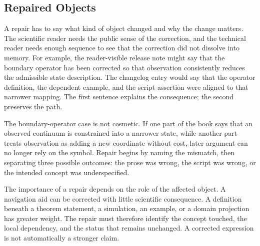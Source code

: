 \documentclass[11pt,a4paper,openany]{book}
\begin{document}
\subsection{Repaired Objects}
A repair has to say what kind of object changed and why the change matters. The scientific reader needs the public sense of the correction, and the technical reader needs enough sequence to see that the correction did not dissolve into memory. For example, the reader-visible release note might say that the boundary operator has been corrected so that observation consistently reduces the admissible state description. The changelog entry would say that the operator definition, the dependent example, and the script assertion were aligned to that narrower mapping. The first sentence explains the consequence; the second preserves the path. \cite{kadanoff_scaling,wilson_renormalization}\par
The boundary-operator case is not cosmetic. If one part of the book says that an observed continuum is constrained into a narrower state, while another part treats observation as adding a new coordinate without cost, later argument can no longer rely on the symbol. Repair begins by naming the mismatch, then separating three possible outcomes: the prose was wrong, the script was wrong, or the intended concept was underspecified.\par
The importance of a repair depends on the role of the affected object. A navigation aid can be corrected with little scientific consequence. A definition beneath a theorem statement, a simulation, an example, or a domain projection has greater weight. The repair must therefore identify the concept touched, the local dependency, and the status that remains unchanged. A corrected expression is not automatically a stronger claim.\par
\end{document}
